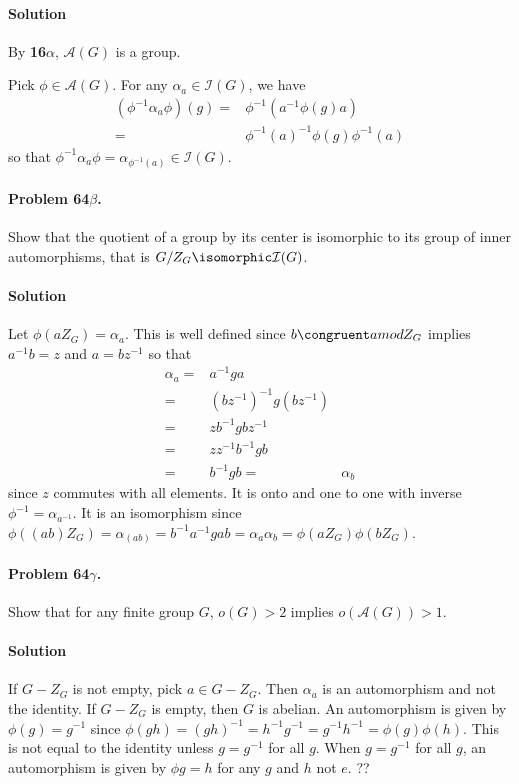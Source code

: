 \paragraph*{Solution}
By \textbf{16$\alpha$}, $\mathcal{A}(G)$ is a group.

Pick $\phi \in \mathcal{A}(G)$. For any $\alpha_a \in \mathcal{I}(G)$,
we have
\begin{align*}
(\phi^{-1} \alpha_a \phi)(g) =& \phi^{-1}(a^{-1}\phi(g)a) \\
  =& \phi^{-1}(a)^{-1} \phi(g) \phi^{-1}(a)
\end{align*}
so that $\phi^{-1} \alpha_a \phi = \alpha_{\phi^{-1}(a)} \in \mathcal{I}(G)$.

\paragraph{Problem 64$\beta$.}
Show that the quotient of a group by its center is isomorphic to its group
of inner automorphisms, that is $G / Z_G \isomorphic \mathcal{I}(G)$.

\paragraph*{Solution}
Let $\phi(aZ_G) = \alpha_a$. This is well defined since $b \congruent a mod Z_G$
implies $a^{-1}b=z$ and $a = bz^{-1}$ so that
\begin{align*}
\alpha_a =& a^{-1}ga \\
=& (bz^{-1})^{-1}g(bz^{-1}) \\
=& zb^{-1}gbz^{-1} \\
=& zz^{-1}b^{-1}gb \\
=& b^{-1}gb
=& \alpha_b
\end{align*}
since $z$ commutes with all elements. It is onto and one to one with inverse
$\phi^{-1} = \alpha_{a^{-1}}$. It is an isomorphism since
$\phi((ab)Z_G) = \alpha_(ab) = b^{-1}a^{-1}gab = \alpha_a \alpha_b = \phi(aZ_G)\phi(bZ_G)$.

\paragraph{Problem 64$\gamma$.}
Show that for any finite group $G$, $o(G) >2$ implies $o(\mathcal{A}(G)) > 1$.

\paragraph*{Solution}
If $G - Z_G$ is not empty, pick $a \in G-Z_G$. Then $\alpha_a$ is an
automorphism and not the identity.
If $G-Z_G$ is empty, then $G$ is abelian. An automorphism is given by
$\phi(g) = g^{-1}$ since
$\phi(gh) = (gh)^{-1} = h^{-1}g^{-1} = g^{-1}h^{-1}= \phi(g)\phi(h)$.
This is not equal to the identity unless $g = g^{-1}$ for all $g$.
When $g = g^{-1}$ for all $g$, an automorphism is given by
$\phi g = h$ for any $g$ and $h$ not $e$. ??

